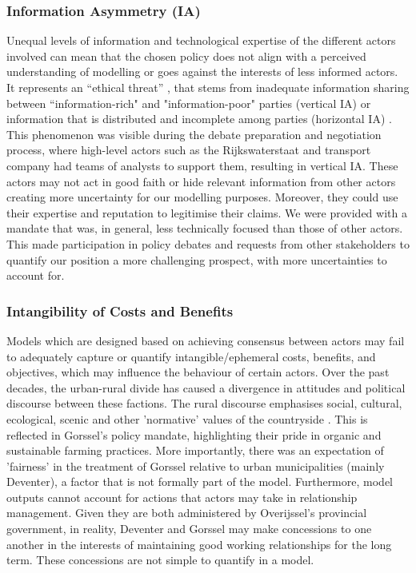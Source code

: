 \subsubsection{Information Asymmetry (IA)}
Unequal levels of information and technological expertise of the different actors involved can mean that the chosen policy does not align with a perceived understanding of modelling or goes against the interests of less informed actors. It represents an “ethical threat” \parencite{albertus_impact_2019}, that stems from inadequate information sharing between “information-rich" and "information-poor" parties (vertical IA) or information that is distributed and incomplete among parties (horizontal IA) \parencite{clarkson_information_2007}. This phenomenon was visible during the debate preparation and negotiation process, where high-level actors such as the Rijkswaterstaat and transport company had teams of analysts to support them, resulting in vertical IA. These actors may not act in good faith or hide relevant information from other actors creating more uncertainty for our modelling purposes. Moreover, they could use their expertise and reputation to legitimise their claims. We were provided with a mandate that was, in general, less technically focused than those of other actors. This made participation in policy debates and requests from other stakeholders to quantify our position a more challenging prospect, with more uncertainties to account for. 

\subsubsection{Intangibility of Costs and Benefits}
Models which are designed based on achieving consensus between actors may fail to adequately capture or quantify intangible/ephemeral costs, benefits, and objectives, which may influence the behaviour of certain actors. Over the past decades, the urban-rural divide has caused a divergence in attitudes and political discourse between these factions. The rural discourse emphasises social, cultural, ecological, scenic and other 'normative' values of the countryside \parencite{frouws_contested_1998, andersson_beyond_2009}. This is reflected in Gorssel's policy mandate, highlighting their pride in organic and sustainable farming practices. More importantly, there was an expectation of 'fairness' in the treatment of Gorssel relative to urban municipalities (mainly Deventer), a factor that is not formally part of the model.
Furthermore, model outputs cannot account for actions that actors may take in relationship management. Given they are both administered by Overijssel's provincial government, in reality, Deventer and Gorssel may make concessions to one another in the interests of maintaining good working relationships for the long term. These concessions are not simple to quantify in a model. 

